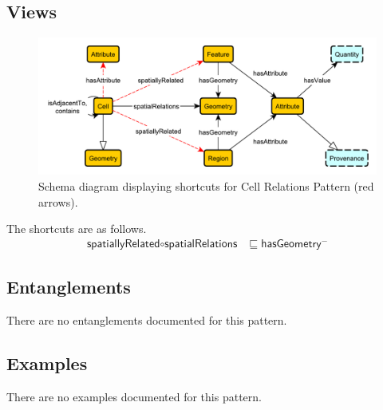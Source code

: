 \subsection{Views}
\label{ssec:views}
\begin{figure}[h!]
  \begin{center}
    \includegraphics[width=\textwidth]{resources/cell-relations-shortcuts.pdf}
  \end{center}
  \caption{Schema diagram displaying shortcuts for Cell Relations Pattern (red arrows).}
  \label{fig:sc-diagram}
\end{figure}
The shortcuts are as follows.\begin{align}
\textsf{spatiallyRelated}  \circ \textsf{spatialRelations} &\sqsubseteq \textsf{hasGeometry$^-$} \end{align}


\subsection{Entanglements}
\label{ssec:entanglements}
There are no entanglements documented for this pattern.

\subsection{Examples}
\label{ssec:examples}
There are no examples documented for this pattern.


